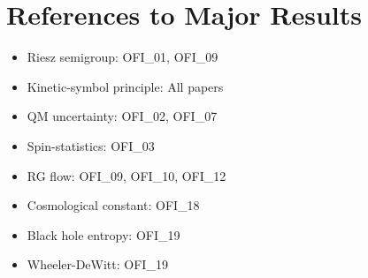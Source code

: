 \documentclass[12pt,a4paper]{article}
\theoremstyle{definition}
\begin{document}
\section{References to Major Results}

\begin{itemize}
\item Riesz semigroup: OFI\_01, OFI\_09
\item Kinetic-symbol principle: All papers
\item QM uncertainty: OFI\_02, OFI\_07
\item Spin-statistics: OFI\_03
\item RG flow: OFI\_09, OFI\_10, OFI\_12
\item Cosmological constant: OFI\_18
\item Black hole entropy: OFI\_19
\item Wheeler-DeWitt: OFI\_19
\end{itemize}
\end{document}
